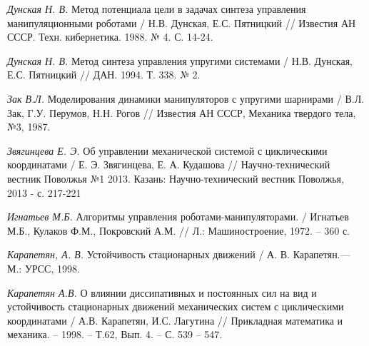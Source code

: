 \begin{thebibliography}{10}
	{\it Дунская Н. В.} Метод потенциала цели в задачах синтеза управления манипуляционными роботами / Н.В. Дунская, Е.С. Пятницкий // Известия АН СССР. Техн. кибернетика. 1988. № 4. С. 14-24.
	
	{\it Дунская Н. В.} Метод синтеза управления упругими системами / Н.В. Дунская, Е.С. Пятницкий // ДАН. 1994. Т. 338. № 2.
	
	{\it Зак В.Л.} Моделирования динамики манипуляторов с упругими шарнирами / В.Л. Зак, Г.У. Перумов, Н.Н. Рогов // Известия АН СССР, Механика твердого тела, №3, 1987.
	
	{\it Звягинцева Е. Э.} Об управлении механической системой с циклическими координатами / Е. Э. Звягинцева, Е. А. Кудашова //
	Научно-технический вестник Поволжья №1 2013. Казань: Научно-технический вестник Поволжья, 2013 - с. 217-221
	
	{\it Игнатьев М.Б.} Алгоритмы управления роботами-манипуляторами. / Игнатьев М.Б., Кулаков Ф.М., Покровский А.М. //  Л.: Машиностроение, 1972. – 	360 с.
	
	{\it Карапетян, А. В.} Устойчивость стационарных движений / А. В. Карапетян.—
	М.: УРСС, 1998.
	
	{\it Карапетян А.В.} О влиянии диссипативных и постоянных сил на вид и устойчивость стационарных движений механических систем с циклическими 		координатами / А.В. Карапетян, И.С. Лагутина // Прикладная математика и механика. – 1998. – Т.62, Вып. 4. – С. 539 – 547.


\end{thebibliography}
